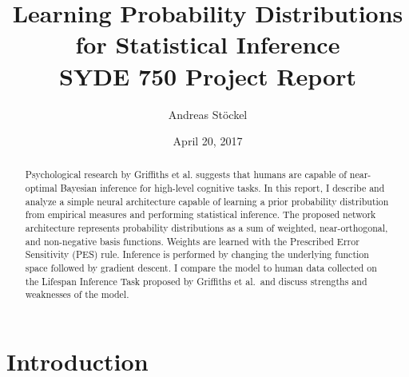 \documentclass[a4paper,11pt]{article}
\title{Learning Probability Distributions for Statistical Inference \\[1em] \Large SYDE 750 Project Report}
\author{Andreas Stöckel}
\date{April 20, 2017}
\begin{document}
\maketitle

\begin{abstract}
Psychological research by Griffiths et al. suggests that humans are capable of near-optimal Bayesian inference for high-level cognitive tasks. In this report, I describe and analyze a simple neural architecture capable of learning a prior probability distribution from empirical measures and performing statistical inference. The proposed network architecture represents probability distributions as a sum of weighted, near-orthogonal, and non-negative basis functions. Weights are learned with the Prescribed Error Sensitivity (PES) rule. Inference is performed by changing the underlying function space followed by gradient descent. I compare the model to human data collected on the Lifespan Inference Task proposed by Griffiths et al.~and discuss strengths and weaknesses of the model.
\end{abstract}

%

\pagebreak

\pagestyle{fancy}
\tableofcontents

\pagebreak

\section{Introduction}
\label{sec:introduction}
\end{document}
